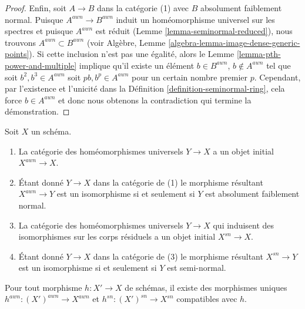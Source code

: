 \begin{proof}
\medskip\noindent
Enfin, soit $A \to B$ dans la catégorie (1) avec $B$ absolument
faiblement normal. Puisque $A^{awn} \to B^{awn}$ induit un homéomorphisme
universel sur les spectres et puisque $A^{awn}$ est réduit
(Lemme \ref{lemma-seminormal-reduced}),
nous trouvons $A^{awn} \subset B^{awn}$ (voir Algèbre, Lemme \ref{algebra-lemma-image-dense-generic-points}).
Si cette inclusion n'est pas une égalité,
alors le Lemme \ref{lemma-pth-power-and-multiple} implique
qu'il existe un élément $b \in B^{awn}$, $b \not \in A^{awn}$ tel
que soit $b^2, b^3 \in A^{awn}$ soit $pb, b^p \in A^{awn}$ pour un certain
nombre premier $p$. Cependant, par l'existence et l'unicité
dans la Définition \ref{definition-seminormal-ring}, cela force $b \in A^{awn}$
et donc nous obtenons la contradiction qui termine la démonstration.
\end{proof}

\begin{lemma}
\label{lemma-seminormalization}
Soit $X$ un schéma.
\begin{enumerate}
\item La catégorie des homéomorphismes universels $Y \to X$
a un objet initial $X^{awn} \to X$.
\item Étant donné $Y \to X$ dans la catégorie de (1) le morphisme résultant $X^{awn} \to Y$
est un isomorphisme si et seulement si $Y$ est absolument
faiblement normal.
\item La catégorie des homéomorphismes universels $Y \to X$ qui induisent
des isomorphismes sur les corps résiduels a un objet initial
$X^{sn} \to X$.
\item Étant donné $Y \to X$ dans la catégorie de (3) le morphisme résultant $X^{sn} \to Y$
est un isomorphisme si et seulement si $Y$ est semi-normal.
\end{enumerate}
Pour tout morphisme $h : X' \to X$ de schémas, il existe des
morphismes uniques $h^{awn} : (X')^{awn} \to X^{awn}$ et $h^{sn} : (X')^{sn} \to X^{sn}$ compatibles avec
$h$.
\end{lemma}

